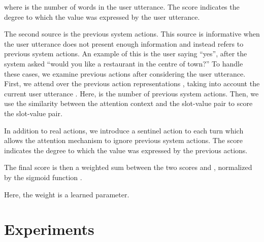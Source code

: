 \documentclass[11pt,a4paper]{article}
\begin{document}
where  is the number of words in the user utterance.
The score  indicates the degree to which the value was expressed by the user utterance.

The second source is the previous system actions.
This source is informative when the user utterance does not present enough information and instead refers to previous system actions.
An example of this is the user saying ``yes'', after the system asked ``would you like a restaurant in the centre of town?''
To handle these cases, we examine previous actions after considering the user utterance.
First, we attend over the previous action representations , taking into account the current user utterance .
Here,  is the number of previous system actions.
Then, we use the similarity between the attention context  and the slot-value pair  to score the slot-value pair.



In addition to real actions, we introduce a sentinel action to each turn which allows the attention mechanism to ignore previous system actions.
The score  indicates the degree to which the value was expressed by the previous actions.

The final score  is then a weighted sum between the two scores  and , normalized by the sigmoid function .



Here, the weight  is a learned parameter.






\section{Experiments}
\end{document}
